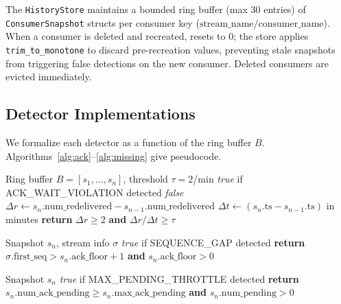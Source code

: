 \documentclass[journal]{IEEEtran}
\begin{document}
The \texttt{HistoryStore} maintains a bounded ring buffer (max 30 entries)
of \texttt{ConsumerSnapshot} structs per consumer key
($\text{stream\_name}/\text{consumer\_name}$). When a consumer is deleted
and recreated,  resets to 0; the store applies
\texttt{trim\_to\_monotone} to discard pre-recreation values, preventing
stale snapshots from triggering false detections on the new consumer.
Deleted consumers are evicted immediately.

\subsection{Detector Implementations}

We formalize each detector as a function of the ring buffer $B$.
Algorithms~\ref{alg:ack}--\ref{alg:missing} give pseudocode.

\begin{algorithm}[t]
\caption{ACK\_WAIT\_VIOLATION Detector}
\label{alg:ack}
\begin{algorithmic}[1]
\Require Ring buffer $B = [s_1, \ldots, s_n]$, threshold $\tau = 2$/min
\Ensure \textit{true} if ACK\_WAIT\_VIOLATION detected
 \Return \textit{false} \EndIf
\State $\Delta r \gets s_n.\text{num\_redelivered} - s_{n-1}.\text{num\_redelivered}$
\State $\Delta t \gets (s_n.\text{ts} - s_{n-1}.\text{ts})$ in minutes
\State \textbf{return} $\Delta r \geq 2$ \textbf{and} $\Delta r / \Delta t \geq \tau$
\end{algorithmic}
\end{algorithm}

\begin{algorithm}[t]
\caption{SEQUENCE\_GAP Detector}
\label{alg:gap}
\begin{algorithmic}[1]
\Require Snapshot $s_n$, stream info $\sigma$
\Ensure \textit{true} if SEQUENCE\_GAP detected
\State \textbf{return} $\sigma.\text{first\_seq} > s_n.\text{ack\_floor} + 1$
        \textbf{and} $s_n.\text{ack\_floor} > 0$
\end{algorithmic}
\end{algorithm}

\begin{algorithm}[t]
\caption{MAX\_PENDING\_THROTTLE Detector}
\label{alg:throttle}
\begin{algorithmic}[1]
\Require Snapshot $s_n$
\Ensure \textit{true} if MAX\_PENDING\_THROTTLE detected
\State \textbf{return} $s_n.\text{num\_ack\_pending} \geq s_n.\text{max\_ack\_pending}$
        \textbf{and} $s_n.\text{num\_pending} > 0$
\end{algorithmic}
\end{algorithm}
\end{document}
